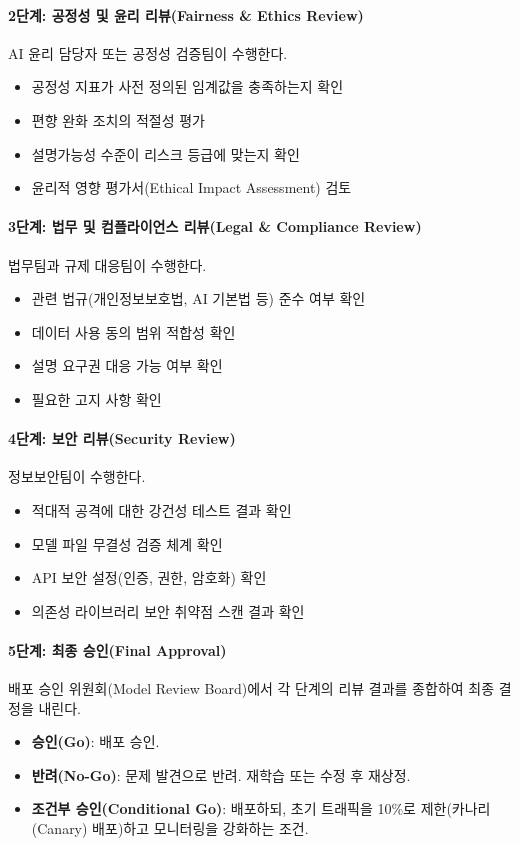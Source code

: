 \paragraph{2단계: 공정성 및 윤리 리뷰(Fairness \& Ethics Review)}
AI 윤리 담당자 또는 공정성 검증팀이 수행한다.
\begin{itemize}
  \item 공정성 지표가 사전 정의된 임계값을 충족하는지 확인
  \item 편향 완화 조치의 적절성 평가
  \item 설명가능성 수준이 리스크 등급에 맞는지 확인
  \item 윤리적 영향 평가서(Ethical Impact Assessment) 검토
\end{itemize}

\paragraph{3단계: 법무 및 컴플라이언스 리뷰(Legal \& Compliance Review)}
법무팀과 규제 대응팀이 수행한다.
\begin{itemize}
  \item 관련 법규(개인정보보호법, AI 기본법 등) 준수 여부 확인
  \item 데이터 사용 동의 범위 적합성 확인
  \item 설명 요구권 대응 가능 여부 확인
  \item 필요한 고지 사항 확인
\end{itemize}

\paragraph{4단계: 보안 리뷰(Security Review)}
정보보안팀이 수행한다.
\begin{itemize}
  \item 적대적 공격에 대한 강건성 테스트 결과 확인
  \item 모델 파일 무결성 검증 체계 확인
  \item API 보안 설정(인증, 권한, 암호화) 확인
  \item 의존성 라이브러리 보안 취약점 스캔 결과 확인
\end{itemize}

\paragraph{5단계: 최종 승인(Final Approval)}
배포 승인 위원회(Model Review Board)에서 각 단계의 리뷰 결과를 종합하여 최종 결정을 내린다.
\begin{itemize}
  \item \textbf{승인(Go)}: 배포 승인.
  \item \textbf{반려(No-Go)}: 문제 발견으로 반려. 재학습 또는 수정 후 재상정.
  \item \textbf{조건부 승인(Conditional Go)}: 배포하되, 초기 트래픽을 10\%로 제한(카나리(Canary) 배포)하고 모니터링을 강화하는 조건.
\end{itemize}

